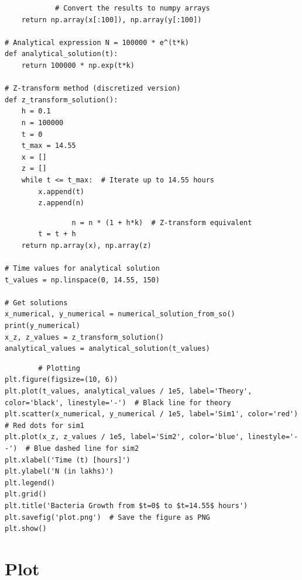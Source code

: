 \documentclass{beamer}
\theoremstyle{remark}
\numberwithin{equation}{section}
\begin{document}
\begin{frame}[fragile]
    \begin{lstlisting}
            # Convert the results to numpy arrays
    return np.array(x[:100]), np.array(y[:100])

# Analytical expression N = 100000 * e^(t*k)
def analytical_solution(t):
    return 100000 * np.exp(t*k)

# Z-transform method (discretized version)
def z_transform_solution():
    h = 0.1
    n = 100000
    t = 0
    t_max = 14.55
    x = []
    z = []
    while t <= t_max:  # Iterate up to 14.55 hours
        x.append(t)
        z.append(n)
    \end{lstlisting}
\end{frame}
\begin{frame}[fragile]
    \begin{lstlisting}
                n = n * (1 + h*k)  # Z-transform equivalent
        t = t + h
    return np.array(x), np.array(z)

# Time values for analytical solution
t_values = np.linspace(0, 14.55, 150)

# Get solutions
x_numerical, y_numerical = numerical_solution_from_so()
print(y_numerical)
x_z, z_values = z_transform_solution()
analytical_values = analytical_solution(t_values)
    \end{lstlisting}
\end{frame}
\begin{frame}[fragile]
    \begin{lstlisting}
        # Plotting
plt.figure(figsize=(10, 6))
plt.plot(t_values, analytical_values / 1e5, label='Theory', color='black', linestyle='-')  # Black line for theory
plt.scatter(x_numerical, y_numerical / 1e5, label='Sim1', color='red')  # Red dots for sim1
plt.plot(x_z, z_values / 1e5, label='Sim2', color='blue', linestyle='--')  # Blue dashed line for sim2
plt.xlabel('Time (t) [hours]')
plt.ylabel('N (in lakhs)')
plt.legend()
plt.grid()
plt.title('Bacteria Growth from $t=0$ to $t=14.55$ hours')
plt.savefig('plot.png')  # Save the figure as PNG
plt.show()
    \end{lstlisting}
\end{frame}
\section{Plot}
\end{document}
